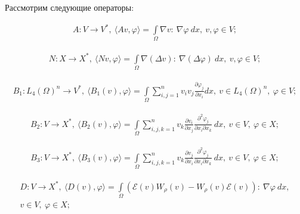 Рассмотрим следующие операторы:

\begin{equation*}
    \begin{gathered}
        A: V \rightarrow V^*, \ \langle Av, \varphi \rangle = \int\limits_\Omega \nabla v: \ \nabla \varphi \ dx, \ v, \varphi \in V;
    \end{gathered}
\end{equation*}

\begin{equation*}
    \begin{gathered}
        N: X \rightarrow X^*, \ \langle Nv, \varphi \rangle = \int\limits_\Omega \nabla(\Delta v): \ \nabla(\Delta\varphi) \ dx, \ v, \varphi \in V;
    \end{gathered}
\end{equation*}

\begin{equation*}
    \begin{gathered}
        B_1: L_4(\Omega)^n \rightarrow V^*
        , \ \langle B_1(v), \varphi \rangle = \int\limits_\Omega \sum_{i,j=1}^n v_i v_j \frac{\partial \varphi_j}{\partial x_i} dx
        , \ v \in L_4(\Omega)^n, \ \varphi \in V;
    \end{gathered}
\end{equation*}

\begin{equation*}
    \begin{gathered}
        B_2: V \rightarrow X^*
        , \ \langle B_2(v), \varphi \rangle = \int\limits_\Omega \sum_{i,j,k=1}^n v_k \frac{\partial v_i}{\partial x_j}
        \frac{\partial^2 \varphi_j}{\partial x_i \partial x_k} \ dx
        , \ v \in V, \ \varphi \in X;
    \end{gathered}
\end{equation*}

\begin{equation*}
    \begin{gathered}
        B_3: V \rightarrow X^*
        , \ \langle B_3(v), \varphi \rangle = \int\limits_\Omega \sum_{i,j,k=1}^n v_k \frac{\partial v_j}{\partial x_i}
        \frac{\partial^2 \varphi_j}{\partial x_i \partial x_k} \ dx
        , \ v \in V, \ \varphi \in X;
    \end{gathered}
\end{equation*}

\begin{equation*}
    \begin{gathered}
        D: V \rightarrow X^*
        , \ \langle D(v), \varphi \rangle = \int\limits_\Omega (\mathcal{E}(v) W_\rho (v) - W_\rho (v) \mathcal{E}(v)): \ \nabla \varphi \ dx, \\
        v \in V, \ \varphi \in X;
    \end{gathered}
\end{equation*}

